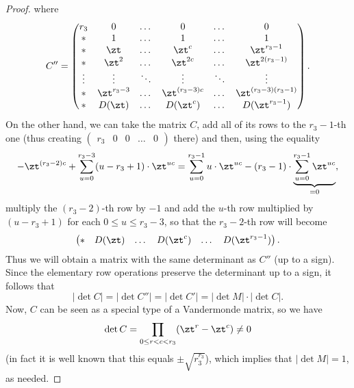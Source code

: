 \begin{proof}
where
$$C''=
\begin{pmatrix}
r_3& 0& \dots & 0 & \dots & 0\\ 
*& 1& \dots & 1 & \dots & 1\\ 
*& \zt& \dots & \zt^c & \dots & \zt^{r_3-1}\\ 
*& \zt^2& \dots & \zt^{2c} & \dots & \zt^{2(r_3-1)}\\ 
\vdots& \vdots&\ddots  & \vdots & \ddots & \vdots\\ 
*& \zt^{r_3-3}& \dots & \zt^{(r_3-3)c} & \dots & \zt^{(r_3-3)(r_3-1)}\\ 
*& D(\zt)& \dots & D(\zt^c) & \dots & D(\zt^{r_3-1})\\ 
\end{pmatrix}.
$$
On the other hand, we can take the matrix $C$, add all of its rows to the $r_3-1$-th one (thus creating $\begin{pmatrix}
r_3 & 0 & 0& \dots &0
\end{pmatrix}$
there) and then, using the equality
$$-\zt^{(r_3-2)c}+\sum_{u=0}^{r_3-3}(u-r_3+1)\cdot\zt^{uc}=\sum_{u=0}^{r_3-1}u\cdot\zt^{uc}-(r_3-1)\cdot\underbrace{\sum_{u=0}^{r_3-1}\zt^{uc}}_{=0},$$ 
multiply the $(r_3-2)$-th row by $-1$ and add the $u$-th row multiplied by $(u-r_3+1)$ for each $0\le u \le r_3-3$,
so that the $r_3-2$-th row will become
$$\begin{pmatrix}
*& D(\zt)& \dots & D(\zt^c) & \dots & D(\zt^{r_3-1})
\end{pmatrix}.$$
Thus we will obtain a matrix with the same determinant as $C''$ (up to a sign). Since the elementary row operations preserve the determinant up to a sign, it follows that
$$|\det C|=|\det C''|=|\det C'|=|\det M|\cdot |\det C|.$$ 
Now, $C$ can be seen as a special type of a Vandermonde matrix, so we have $$\det C=\prod_{0\leq r<c<r_3}(\zt^r-\zt^c)\neq 0$$
(in fact it is well known that this equals $\pm \sqrt{r_3^{r_3}}$), which implies that %
 $|\det M|=1$, as needed.
\end{proof}


